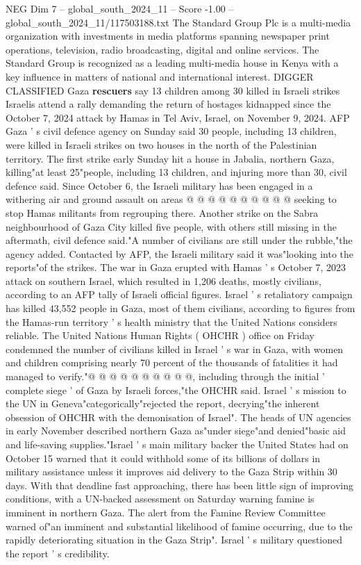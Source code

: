 \begin{textsample}{NEG Dim 7 – global\_south\_2024\_11 – Score -1.00 – global\_south\_2024\_11/117503188.txt}  \label{ex:f7_neg_318}
The Standard Group Plc is a multi-media organization with investments in media platforms spanning newspaper print operations, television, radio broadcasting, digital and online services.
The Standard Group is recognized as a leading multi-media house in Kenya with a key influence in matters of national and international interest.
DIGGER CLASSIFIED Gaza \textbf{rescuers} say 13 children among 30 killed in Israeli strikes Israelis attend a rally demanding the return of hostages kidnapped since the October 7, 2024 attack by Hamas in Tel Aviv, Israel, on November 9, 2024.
AFP Gaza ' s civil defence agency on Sunday said 30 people, including 13 children, were killed in Israeli strikes on two houses in the north of the Palestinian territory.
The first strike early Sunday hit a house in Jabalia, northern Gaza, killing"at least 25"people, including 13 children, and injuring more than 30, civil defence said.
Since October 6, the Israeli military has been engaged in a withering air and ground assault on areas @ @ @ @ @ @ @ @ @ @ seeking to stop Hamas militants from regrouping there.
Another strike on the Sabra neighbourhood of Gaza City killed five people, with others still missing in the aftermath, civil defence said."A number of civilians are still under the rubble,"the agency added.
Contacted by AFP, the Israeli military said it was"looking into the reports"of the strikes.
The war in Gaza erupted with Hamas ' s October 7, 2023 attack on southern Israel, which resulted in 1,206 deaths, mostly civilians, according to an AFP tally of Israeli official figures.
Israel ' s retaliatory campaign has killed 43,552 people in Gaza, most of them civilians, according to figures from the Hamas-run territory ' s health ministry that the United Nations considers reliable.
The United Nations Human Rights ( OHCHR ) office on Friday condemned the number of civilians killed in Israel ' s war in Gaza, with women and children comprising nearly 70 percent of the thousands of fatalities it had managed to verify."@ @ @ @ @ @ @ @ @ @, including through the initial ' complete siege ' of Gaza by Israeli forces,"the OHCHR said.
Israel ' s mission to the UN in Geneva"categorically"rejected the report, decrying"the inherent obsession of OHCHR with the demonisation of Israel".
The heads of UN agencies in early November described northern Gaza as"under siege"and denied"basic aid and life-saving supplies."Israel ' s main military backer the United States had on October 15 warned that it could withhold some of its billions of dollars in military assistance unless it improves aid delivery to the Gaza Strip within 30 days.
With that deadline fast approaching, there has been little sign of improving conditions, with a UN-backed assessment on Saturday warning famine is imminent in northern Gaza.
The alert from the Famine Review Committee warned of"an imminent and substantial likelihood of famine occurring, due to the rapidly deteriorating situation in the Gaza Strip".
Israel ' s military questioned the report ' s credibility.

\end{textsample}
